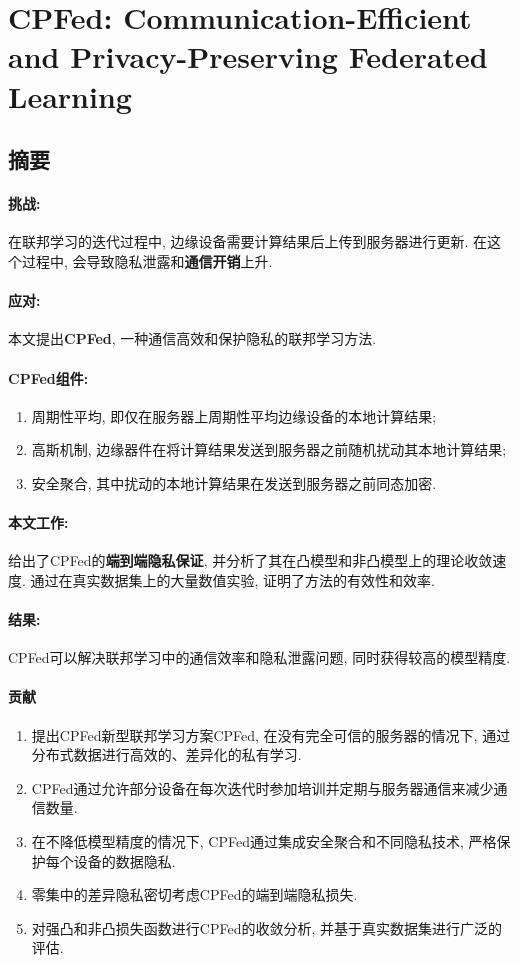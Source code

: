 
\section{CPFed: Communication-Efficient and Privacy-Preserving Federated Learning}

\subsection{摘要}
\paragraph{挑战:} 在联邦学习的迭代过程中, 边缘设备需要计算结果后上传到服务器进行更新. 在这个过程中, 会导致隐私泄露和\textbf{通信开销}上升. 
\paragraph{应对:} 本文提出\textbf{CPFed}, 一种通信高效和保护隐私的联邦学习方法.
\paragraph{CPFed组件:} 
\begin{enumerate}[label=(\arabic*)]  
    \item 周期性平均, 即仅在服务器上周期性平均边缘设备的本地计算结果;
    \item 高斯机制, 边缘器件在将计算结果发送到服务器之前随机扰动其本地计算结果;
    \item 安全聚合, 其中扰动的本地计算结果在发送到服务器之前同态加密. 
\end{enumerate}
\paragraph{本文工作:} 给出了CPFed的\textbf{端到端隐私保证}, 并分析了其在凸模型和非凸模型上的理论收敛速度. 通过在真实数据集上的大量数值实验, 证明了方法的有效性和效率. 
\paragraph{结果:}CPFed可以解决联邦学习中的通信效率和隐私泄露问题, 同时获得较高的模型精度.  \cite{hu2020cpfed}

\paragraph{贡献}
\begin{enumerate}
    \item 提出CPFed新型联邦学习方案CPFed, 在没有完全可信的服务器的情况下, 通过分布式数据进行高效的、差异化的私有学习. 
    \item CPFed通过允许部分设备在每次迭代时参加培训并定期与服务器通信来减少通信数量. 
    \item 在不降低模型精度的情况下, CPFed通过集成安全聚合和不同隐私技术, 严格保护每个设备的数据隐私. 
    \item 零集中的差异隐私密切考虑CPFed的端到端隐私损失. 
    \item  对强凸和非凸损失函数进行CPFed的收敛分析, 并基于真实数据集进行广泛的评估. 
\end{enumerate}

